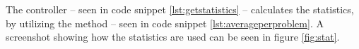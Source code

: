 The  controller -- seen in code snippet \ref{lst:getstatistics} -- calculates the statistics, by utilizing the  method -- seen in code snippet \ref{lst:averageperproblem}. A screenshot showing how the statistics are used can be seen in figure \ref{fig:stat}.

